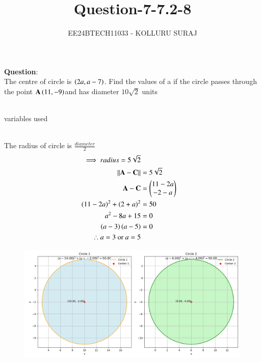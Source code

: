 \documentclass[journal]{IEEEtran}
\numberwithin{equation}{enumi}
\numberwithin{figure}{enumi}
\begin{document}

\title{Question-7-7.2-8}
\author{EE24BTECH11033 - KOLLURU SURAJ}
{\let\newpage\relax\maketitle}
\textbf{Question}:\\
The centre of circle is $\left(2a,a-7\right)$. Find the values of a if the circle passes through the point $\mathbf{A}\left(11,-9\right)$and has diameter $10\sqrt{2}$ units 
\\
\solution \\
\begin{table}[!ht]
  \centering
  
  \caption{variables used}
\end{table}\\
The radius of circle is $\frac{diameter}{2}$
\begin{align}
    \implies radius=5\sqrt{2}\\
    \left\lVert\mathbf{A}-\mathbf{C}\right\rVert &= 5\sqrt{2}\\
    \mathbf{A}-\mathbf{C} &= \begin{pmatrix}11-2a \\ -2-a\end{pmatrix}\\
    \left(11-2a\right)^2 +\left(2+a\right)^2 &= 50\\
    a^2-8a+15 &= 0\\
    \left(a-3\right)\left(a-5\right)&=0\\
	\therefore  a =3 \text{ or } a = 5
\end{align}
\begin{figure}[!ht]
    \centering
    \includegraphics[width=\linewidth]{figs/Figure_1.png}
    \caption{}
\end{figure}
\end{document}
